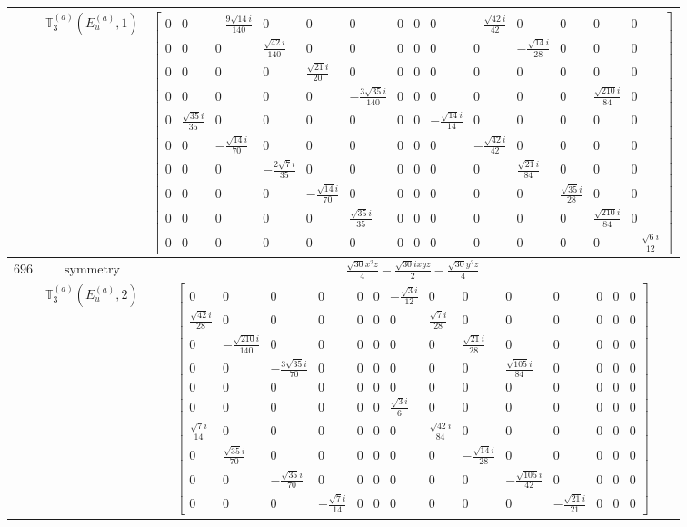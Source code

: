 \documentclass[fleqn,8pt,landscape]{jsarticle}
\begin{document}
\begin{longtable}{ccc}
$  $ & $ \mathbb{T}_{3}^{(a)}(E_{u}^{(a)},1) $ & $ \begin{bmatrix} 0 & 0 & - \frac{9 \sqrt{14} i}{140} & 0 & 0 & 0 & 0 & 0 & 0 & - \frac{\sqrt{42} i}{42} & 0 & 0 & 0 & 0 \\ 0 & 0 & 0 & \frac{\sqrt{42} i}{140} & 0 & 0 & 0 & 0 & 0 & 0 & - \frac{\sqrt{14} i}{28} & 0 & 0 & 0 \\ 0 & 0 & 0 & 0 & \frac{\sqrt{21} i}{20} & 0 & 0 & 0 & 0 & 0 & 0 & 0 & 0 & 0 \\ 0 & 0 & 0 & 0 & 0 & - \frac{3 \sqrt{35} i}{140} & 0 & 0 & 0 & 0 & 0 & 0 & \frac{\sqrt{210} i}{84} & 0 \\ 0 & \frac{\sqrt{35} i}{35} & 0 & 0 & 0 & 0 & 0 & 0 & - \frac{\sqrt{14} i}{14} & 0 & 0 & 0 & 0 & 0 \\ 0 & 0 & - \frac{\sqrt{14} i}{70} & 0 & 0 & 0 & 0 & 0 & 0 & - \frac{\sqrt{42} i}{42} & 0 & 0 & 0 & 0 \\ 0 & 0 & 0 & - \frac{2 \sqrt{7} i}{35} & 0 & 0 & 0 & 0 & 0 & 0 & \frac{\sqrt{21} i}{84} & 0 & 0 & 0 \\ 0 & 0 & 0 & 0 & - \frac{\sqrt{14} i}{70} & 0 & 0 & 0 & 0 & 0 & 0 & \frac{\sqrt{35} i}{28} & 0 & 0 \\ 0 & 0 & 0 & 0 & 0 & \frac{\sqrt{35} i}{35} & 0 & 0 & 0 & 0 & 0 & 0 & \frac{\sqrt{210} i}{84} & 0 \\ 0 & 0 & 0 & 0 & 0 & 0 & 0 & 0 & 0 & 0 & 0 & 0 & 0 & - \frac{\sqrt{6} i}{12} \end{bmatrix} $ \\ \hline
$ 696 $ & $ \text{symmetry} $ & $ \frac{\sqrt{30} x^{2} z}{4} - \frac{\sqrt{30} i x y z}{2} - \frac{\sqrt{30} y^{2} z}{4} $ \\
$  $ & $ \mathbb{T}_{3}^{(a)}(E_{u}^{(a)},2) $ & $ \begin{bmatrix} 0 & 0 & 0 & 0 & 0 & 0 & - \frac{\sqrt{3} i}{12} & 0 & 0 & 0 & 0 & 0 & 0 & 0 \\ \frac{\sqrt{42} i}{28} & 0 & 0 & 0 & 0 & 0 & 0 & \frac{\sqrt{7} i}{28} & 0 & 0 & 0 & 0 & 0 & 0 \\ 0 & - \frac{\sqrt{210} i}{140} & 0 & 0 & 0 & 0 & 0 & 0 & \frac{\sqrt{21} i}{28} & 0 & 0 & 0 & 0 & 0 \\ 0 & 0 & - \frac{3 \sqrt{35} i}{70} & 0 & 0 & 0 & 0 & 0 & 0 & \frac{\sqrt{105} i}{84} & 0 & 0 & 0 & 0 \\ 0 & 0 & 0 & 0 & 0 & 0 & 0 & 0 & 0 & 0 & 0 & 0 & 0 & 0 \\ 0 & 0 & 0 & 0 & 0 & 0 & \frac{\sqrt{3} i}{6} & 0 & 0 & 0 & 0 & 0 & 0 & 0 \\ \frac{\sqrt{7} i}{14} & 0 & 0 & 0 & 0 & 0 & 0 & \frac{\sqrt{42} i}{84} & 0 & 0 & 0 & 0 & 0 & 0 \\ 0 & \frac{\sqrt{35} i}{70} & 0 & 0 & 0 & 0 & 0 & 0 & - \frac{\sqrt{14} i}{28} & 0 & 0 & 0 & 0 & 0 \\ 0 & 0 & - \frac{\sqrt{35} i}{70} & 0 & 0 & 0 & 0 & 0 & 0 & - \frac{\sqrt{105} i}{42} & 0 & 0 & 0 & 0 \\ 0 & 0 & 0 & - \frac{\sqrt{7} i}{14} & 0 & 0 & 0 & 0 & 0 & 0 & - \frac{\sqrt{21} i}{21} & 0 & 0 & 0 \end{bmatrix} $ \\ \hline

\end{longtable}
\end{document}
